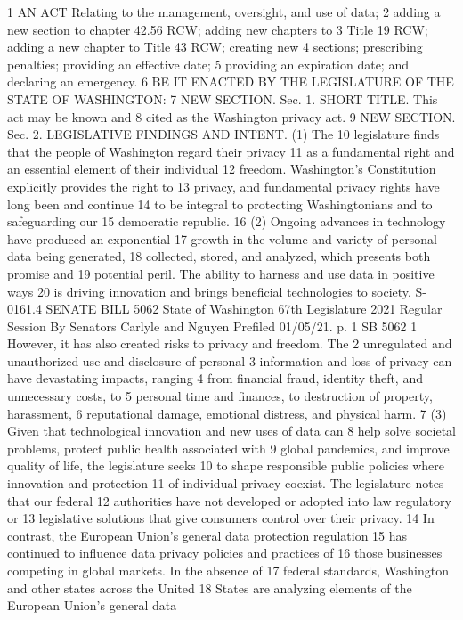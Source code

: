 1 AN ACT Relating to the management, oversight, and use of data;
2 adding a new section to chapter 42.56 RCW; adding new chapters to
3 Title 19 RCW; adding a new chapter to Title 43 RCW; creating new
4 sections; prescribing penalties; providing an effective date;
5 providing an expiration date; and declaring an emergency.
6 BE IT ENACTED BY THE LEGISLATURE OF THE STATE OF WASHINGTON:
7 NEW SECTION. Sec. 1. SHORT TITLE. This act may be known and
8 cited as the Washington privacy act.
9 NEW SECTION. Sec. 2. LEGISLATIVE FINDINGS AND INTENT. (1) The
10 legislature finds that the people of Washington regard their privacy
11 as a fundamental right and an essential element of their individual
12 freedom. Washington's Constitution explicitly provides the right to
13 privacy, and fundamental privacy rights have long been and continue
14 to be integral to protecting Washingtonians and to safeguarding our
15 democratic republic.
16 (2) Ongoing advances in technology have produced an exponential
17 growth in the volume and variety of personal data being generated,
18 collected, stored, and analyzed, which presents both promise and
19 potential peril. The ability to harness and use data in positive ways
20 is driving innovation and brings beneficial technologies to society.
S-0161.4
SENATE BILL 5062
State of Washington 67th Legislature 2021 Regular Session
By Senators Carlyle and Nguyen
Prefiled 01/05/21.
p. 1 SB 5062
1 However, it has also created risks to privacy and freedom. The
2 unregulated and unauthorized use and disclosure of personal
3 information and loss of privacy can have devastating impacts, ranging
4 from financial fraud, identity theft, and unnecessary costs, to
5 personal time and finances, to destruction of property, harassment,
6 reputational damage, emotional distress, and physical harm.
7 (3) Given that technological innovation and new uses of data can
8 help solve societal problems, protect public health associated with
9 global pandemics, and improve quality of life, the legislature seeks
10 to shape responsible public policies where innovation and protection
11 of individual privacy coexist. The legislature notes that our federal
12 authorities have not developed or adopted into law regulatory or
13 legislative solutions that give consumers control over their privacy.
14 In contrast, the European Union's general data protection regulation
15 has continued to influence data privacy policies and practices of
16 those businesses competing in global markets. In the absence of
17 federal standards, Washington and other states across the United
18 States are analyzing elements of the European Union's general data
